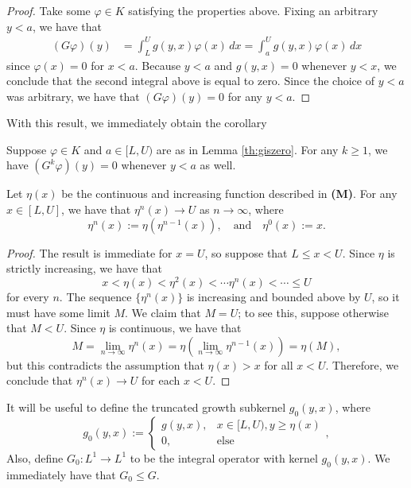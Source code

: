 \begin{proof}
	Take some $\varphi \in K$ satisfying the properties above. Fixing an arbitrary $y<a$, we have that
	\begin{align*}
		(G\varphi)(y) &= \int_L^U g(y,x) \varphi(x) \, dx = \int_a^U g(y,x) \varphi(x) \, dx
	\end{align*}
	since $\varphi(x) = 0$ for $x < a$. Because $y<a$ and $g(y,x) = 0$ whenever $y<x$, we conclude that the second integral above is equal to zero. Since the choice of $y<a$ was arbitrary, we have that $(G\varphi)(y) = 0$ for any $y<a$.
	
\end{proof}

With this result, we immediately obtain the corollary

\begin{corollary} \label{th:corollarytogiszero}
	Suppose $\varphi \in K$ and $a \in [L,U)$ are as in Lemma \ref{th:giszero}. For any $k \geq 1$, we have $(G^k \varphi)(y) = 0$ whenever $y < a$ as well.
\end{corollary}

\begin{lemma} \label{th:etalimit}
	Let $\eta(x)$ be the continuous and increasing function described in \textbf{(M)}. For any $x \in [L,U]$, we have that $\eta^n(x) \to U$ as $n \to \infty$, where
	\[\eta^n(x) := \eta(\eta^{n-1}(x)), \quad \text{and} \quad \eta^0(x) := x.\]
\end{lemma}

\begin{proof}
	The result is immediate for $x = U$, so suppose that $L \leq x <U$. Since $\eta$ is strictly increasing, we have that
	\[x < \eta(x) < \eta^2(x) < \cdots \eta^n(x) < \cdots \leq U\]
	for every $n$. The sequence $\{\eta^n(x)\}$ is increasing and bounded above by $U$, so it must have some limit $M$. We claim that $M = U$; to see this, suppose otherwise that $M < U$. Since $\eta$ is continuous, we have that
	\[M = \lim_{n \to \infty} \eta^n(x) = \eta \left( \lim_{n \to \infty} \eta^{n-1}(x) \right) = \eta(M),\]
	but this contradicts the assumption that $\eta(x) > x$ for all $x < U$. Therefore, we conclude that $\eta^n(x) \to U$ for each $x<U$.
	
\end{proof}

It will be useful to define the truncated growth subkernel $g_0(y,x)$, where
\[g_0(y,x):= \left\{
\begin{array}{lc}
g(y,x), & x \in [L,U), y \geq \eta(x) \\
0, & \text{else}
\end{array}
\right.,
\]
Also, define $G_0:L^1 \to L^1$ to be the integral operator with kernel $g_0(y,x)$. We immediately have that $G_0 \leq G$.

